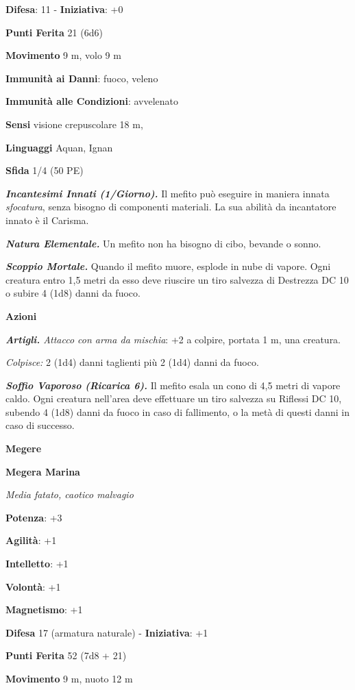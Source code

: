 \begin{multicols}{2}
\textbf{Difesa}: 11 - \textbf{Iniziativa}: +0

\textbf{Punti Ferita} 21 (6d6)

\textbf{Movimento} 9 m, volo 9 m

\textbf{Immunità ai Danni}: fuoco, veleno

\textbf{Immunità alle Condizioni}: avvelenato

\textbf{Sensi} visione crepuscolare 18 m, 

\textbf{Linguaggi} Aquan, Ignan

\textbf{Sfida} 1/4 (50 PE)\smallskip

\emph{\textbf{Incantesimi Innati (1/Giorno).}} Il mefito può eseguire in
maniera innata \emph{sfocatura}, senza bisogno di componenti materiali.
La sua abilità da incantatore innato è il Carisma.

\emph{\textbf{Natura Elementale.}} Un mefito non ha bisogno di cibo,
bevande o sonno.

\emph{\textbf{Scoppio Mortale.}} Quando il mefito muore, esplode in nube
di vapore. Ogni creatura entro 1,5 metri da esso deve riuscire un tiro
salvezza di Destrezza DC 10 o subire 4 (1d8) danni da fuoco.

\smallskip\textbf{Azioni}

\emph{\textbf{Artigli.} Attacco con arma da mischia}: +2 a colpire,
portata 1 m, una creatura.

\emph{Colpisce:} 2 (1d4) danni taglienti più 2 (1d4) danni da fuoco.

\emph{\textbf{Soffio Vaporoso (Ricarica 6).}} Il mefito esala un cono di
4,5 metri di vapore caldo. Ogni creatura nell'area deve effettuare un
tiro salvezza su Riflessi DC 10, subendo 4 (1d8) danni da fuoco in caso
di fallimento, o la metà di questi danni in caso di successo.

\textbf{Megere}

\textbf{Megera Marina}

\emph{Media fatato, caotico malvagio}

\textbf{Potenza}: +3

\textbf{Agilità}: +1

\textbf{Intelletto}: +1

\textbf{Volontà}: +1

\textbf{Magnetismo}: +1

\textbf{Difesa} 17 (armatura naturale) - \textbf{Iniziativa}: +1

\textbf{Punti Ferita} 52 (7d8 + 21)

\textbf{Movimento} 9 m, nuoto 12 m


\end{multicols}
